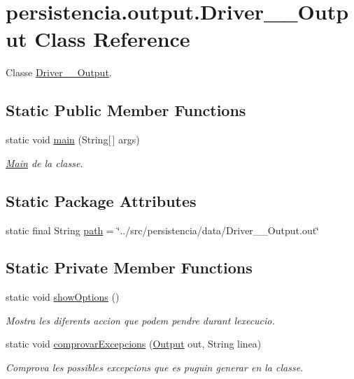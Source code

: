 \hypertarget{classpersistencia_1_1output_1_1Driver____Output}{}\section{persistencia.\+output.\+Driver\+\_\+\+\_\+\+Output Class Reference}
\label{classpersistencia_1_1output_1_1Driver____Output}


Classe \hyperlink{classpersistencia_1_1output_1_1Driver____Output}{Driver\+\_\+\+\_\+\+Output}.  


\subsection*{Static Public Member Functions}
\begin{DoxyCompactItemize}
\item 
static void \hyperlink{classpersistencia_1_1output_1_1Driver____Output_a1fcfdd813a7c5460772e74b5709fc030}{main} (String\mbox{[}$\,$\mbox{]} args)
\begin{DoxyCompactList}\small\item\em \hyperlink{classMain}{Main} de la classe. \end{DoxyCompactList}\end{DoxyCompactItemize}
\subsection*{Static Package Attributes}
\begin{DoxyCompactItemize}
\item 
static final String \hyperlink{classpersistencia_1_1output_1_1Driver____Output_a1701bae356c7bf388a5466895c22ff64}{path} = \char`\"{}../src/persistencia/data/Driver\+\_\+\+\_\+\+Output.\+out\char`\"{}
\end{DoxyCompactItemize}
\subsection*{Static Private Member Functions}
\begin{DoxyCompactItemize}
\item 
static void \hyperlink{classpersistencia_1_1output_1_1Driver____Output_a73ae13b88bf305d442012408333aae35}{show\+Options} ()
\begin{DoxyCompactList}\small\item\em Mostra les diferents accion que podem pendre durant l\textquotesingle{}execucio. \end{DoxyCompactList}\item 
static void \hyperlink{classpersistencia_1_1output_1_1Driver____Output_a88243f6a932e15c580fcbcc31a21b9bc}{comprovar\+Excepcions} (\hyperlink{classpersistencia_1_1output_1_1Output}{Output} out, String linea)
\begin{DoxyCompactList}\small\item\em Comprova les possibles excepcions que es puguin generar en la classe. \end{DoxyCompactList}\end{DoxyCompactItemize}


